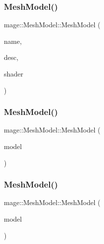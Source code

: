 \subsubsection{\texorpdfstring{Mesh\+Model()}{MeshModel()}\hspace{0.1cm}{\footnotesize\ttfamily [1/3]}}
{\footnotesize\ttfamily mage\+::\+Mesh\+Model\+::\+Mesh\+Model (\begin{DoxyParamCaption}\item[{const string \&}]{name,  }\item[{const \hyperlink{classmage_1_1_model_descriptor}{Model\+Descriptor} \&}]{desc,  }\item[{const \hyperlink{structmage_1_1_combined_shader}{Combined\+Shader} \&}]{shader }\end{DoxyParamCaption})}

\hypertarget{classmage_1_1_mesh_model_a74d2443e5d4b0f66ef981ad1312e4987}{}\label{classmage_1_1_mesh_model_a74d2443e5d4b0f66ef981ad1312e4987} 
\subsubsection{\texorpdfstring{Mesh\+Model()}{MeshModel()}\hspace{0.1cm}{\footnotesize\ttfamily [2/3]}}
{\footnotesize\ttfamily mage\+::\+Mesh\+Model\+::\+Mesh\+Model (\begin{DoxyParamCaption}\item[{const \hyperlink{classmage_1_1_mesh_model}{Mesh\+Model} \&}]{model }\end{DoxyParamCaption})}

\hypertarget{classmage_1_1_mesh_model_afd5dc4033fe3d1277e4d2756b0de2c04}{}\label{classmage_1_1_mesh_model_afd5dc4033fe3d1277e4d2756b0de2c04} 
\subsubsection{\texorpdfstring{Mesh\+Model()}{MeshModel()}\hspace{0.1cm}{\footnotesize\ttfamily [3/3]}}
{\footnotesize\ttfamily mage\+::\+Mesh\+Model\+::\+Mesh\+Model (\begin{DoxyParamCaption}\item[{\hyperlink{classmage_1_1_mesh_model}{Mesh\+Model} \&\&}]{model }\end{DoxyParamCaption})}

